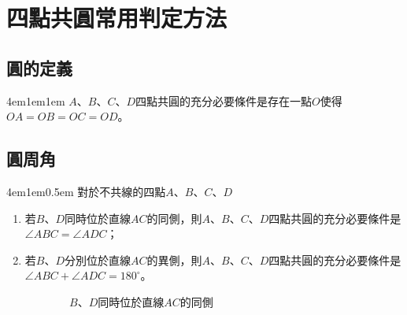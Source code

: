 \documentclass[12pt]{article}
\begin{document}
\section{四點共圓常用判定方法}
\subsection{圓的定義}
\begin{mybox}[定理]{4em}{1em}{1em}
    $A$、$B$、$C$、$D$四點共圓的充分必要條件是存在一點$O$使得$OA=OB=OC=OD$。
\end{mybox}
\subsection{圓周角}
\begin{mybox}[定理]{4em}{1em}{0.5em}
    對於不共線的四點$A$、$B$、$C$、$D$
    \begin{enumerate}[itemsep=0.3em]
        \item 若$B$、$D$同時位於直線$AC$的同側，則$A$、$B$、$C$、$D$四點共圓的充分必要條件是$\angle{ABC}=\angle{ADC}$；
        \item 若$B$、$D$分別位於直線$AC$的異側，則$A$、$B$、$C$、$D$四點共圓的充分必要條件是$\angle{ABC}+\angle{ADC}=180^\circ$。
    \end{enumerate}
    \begin{figure}[H]
        \centering
        \begin{subfigure}[b]{0.45\textwidth}
            \centering
            \caption{$B$、$D$同時位於直線$AC$的同側}
            \label{fig:concyclic_s2.1-1}
        \end{subfigure}
        \hfill %
        \begin{subfigure}[b]{0.45\textwidth}

\end{subfigure}
\end{figure}
\end{mybox}
\end{document}
